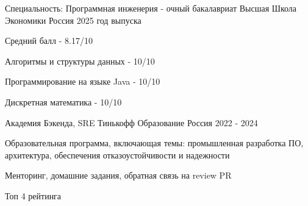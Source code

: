 

\begin{cventries}

  \cventry
    {Специальность: Программная инженерия - очный бакалавриат} %
    {Высшая Школа Экономики} %
    {Россия} %
    {2025 год выпуска} %
    { 
      \begin{cvitems}
      \item{Средний балл - 8.17/10}
      \item{Алгоритмы и структуры данных - 10/10}
      \item{Программирование на языке Java - 10/10}
      \item{Дискретная математика - 10/10}
      \end{cvitems}
      \vspace{7mm}
    }

  \cventry
    {Академия Бэкенда, SRE} %
    {Тинькофф Образование} %
    {Россия} %
    {2022 - 2024} %
    {  \begin{cvitems}
        \item{Образовательная программа, включающая темы: промышленная разработка ПО, архитектура, обеспечения отказоустойчивости и надежности}
        \item{Менторинг, домашние задания, обратная связь на review PR}
        \item{Топ 4 рейтинга}
      \end{cvitems}
    }

\end{cventries}




